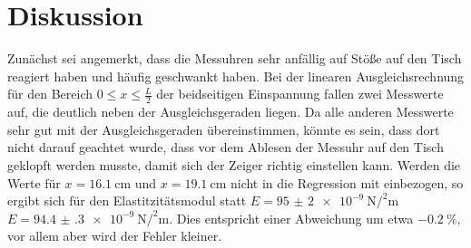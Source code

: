 \section{Diskussion}
\label{sec:Diskussion}
Zunächst sei angemerkt, dass die Messuhren sehr anfällig auf Stöße auf den Tisch
reagiert haben und häufig geschwankt haben.
Bei der linearen Ausgleichsrechnung für den Bereich $0 \leq x \leq \frac{L}{2}$
der beidseitigen Einspannung fallen zwei Messwerte auf, die deutlich neben der
Ausgleichsgeraden liegen. Da alle anderen Messwerte sehr gut mit der Ausgleichsgeraden
übereinstimmen, könnte es sein, dass dort nicht darauf geachtet wurde, dass vor
dem Ablesen der Messuhr auf den Tisch geklopft werden musste, damit sich der
Zeiger richtig einstellen kann.
Werden die Werte für $x=\SI{16.1}{\centi\meter}$ und $x=\SI{19.1}{\centi\meter}$
nicht in die Regression mit einbezogen, so ergibt sich für den Elastitzitätsmodul
statt $E = \SI{95(2)e-9}{\newton\per\squared\meter}$ $E = \SI{94.4(3)e-9}
{\newton\per\squared\meter}$. Dies entspricht einer Abweichung um etwa $\SI{-0.2}
{\percent}$, vor allem aber wird der Fehler kleiner.
